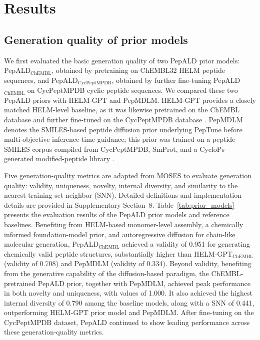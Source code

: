 \section{Results}\label{sec:results}

\subsection{Generation quality of prior models}\label{subsec:prior_generation_quality}

We first evaluated the basic generation quality of two PepALD prior models: PepALD$_{\mathrm{ChEMBL}}$, obtained by pretraining on ChEMBL32 HELM peptide sequences, and PepALD$_{\mathrm{CycPeptMPDB}}$, obtained by further fine-tuning PepALD$_{\mathrm{ChEMBL}}$ on CycPeptMPDB cyclic peptide sequences.
We compared these two PepALD priors with HELM-GPT and PepMDLM.
HELM-GPT provides a closely matched HELM-level baseline, as it was likewise pretrained on the ChEMBL database and further fine-tuned on the CycPeptMPDB database \citep{ref_helm_gpt}.
PepMDLM denotes the SMILES-based peptide diffusion prior underlying PepTune before multi-objective inference-time guidance; this prior was trained on a peptide SMILES corpus compiled from CycPeptMPDB, SmProt, and a CycloPs-generated modified-peptide library \citep{ref_peptune}.

Five generation-quality metrics are adapted from MOSES \citep{ref_moses} to evaluate generation quality: validity, uniqueness, novelty, internal diversity, and similarity to the nearest training-set neighbor (SNN). Detailed definitions and implementation details are provided in Supplementary Section~8. Table~\ref{tab:prior_models} presents the evaluation results of the PepALD prior models and reference baselines.
Benefiting from HELM-based monomer-level assembly, a chemically informed foundation-model prior, and autoregressive diffusion for chain-like molecular generation, PepALD$_{\mathrm{ChEMBL}}$ achieved a validity of 0.951 for generating chemically valid peptide structures, substantially higher than HELM-GPT$_{\mathrm{ChEMBL}}$ (validity of 0.708) and PepMDLM (validity of 0.334).
Beyond validity, benefiting from the generative capability of the diffusion-based paradigm, the ChEMBL-pretrained PepALD prior, together with PepMDLM, achieved peak performance in both novelty and uniqueness, with values of 1.000.
It also achieved the highest internal diversity of 0.790 among the baseline models, along with a SNN of 0.441, outperforming HELM-GPT prior model and PepMDLM.
After fine-tuning on the CycPeptMPDB dataset, PepALD continued to show leading performance across these generation-quality metrics.

